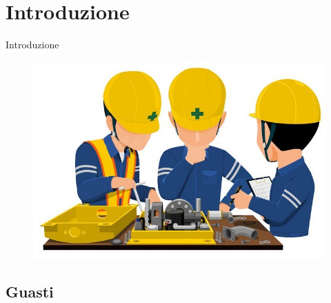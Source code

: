\footnotesize

\section{Introduzione}

	\begin{frame}
		\begin{center}
			\Huge{Introduzione}
		\end{center}
		\begin{center}
			\begin{figure}
				\includegraphics[width=.7\textwidth]{img/guasto}
			\end{figure}
		\end{center}
	\end{frame}

	\subsection{Guasti}
	
		
